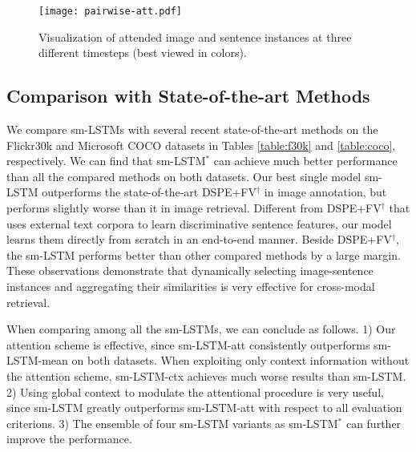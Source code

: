 \documentclass[10pt,twocolumn,letterpaper]{article}
\begin{document}
\begin{figure*}[t]
\begin{center}
\texttt{[image: pairwise-att.pdf]}
\end{center}
\caption{Visualization of attended image and sentence instances at three different timesteps (best
viewed in colors).}
\label{fig:pairwise}
\end{figure*}






\subsection{Comparison with State-of-the-art Methods}

We compare sm-LSTMs with several recent state-of-the-art methods
on the Flickr30k and Microsoft COCO datasets
in Tables \ref{table:f30k} and \ref{table:coco}, respectively.
We can find that sm-LSTM$^*$ can achieve much better performance
than all the compared methods on both datasets.
Our best single model sm-LSTM outperforms the
state-of-the-art DSPE+FV$^{\dag}$ in image annotation, but performs slightly worse
than it in image retrieval.
Different from DSPE+FV$^{\dag}$ that uses external text corpora to learn discriminative sentence features, our model
learns them directly from scratch in an end-to-end manner.
Beside DSPE+FV$^{\dag}$, the sm-LSTM performs better than other compared methods by a large margin.
These observations demonstrate that dynamically selecting image-sentence instances and
aggregating their similarities is very effective for cross-modal retrieval.


When comparing among all the sm-LSTMs, we can conclude as follows.
1) Our attention scheme is effective,
since sm-LSTM-att consistently outperforms sm-LSTM-mean on both datasets.
When exploiting only context information without the attention scheme,
sm-LSTM-ctx achieves much worse results than sm-LSTM.
2) Using global context to modulate the attentional procedure
is very useful, since sm-LSTM greatly outperforms sm-LSTM-att
with respect to all evaluation criterions.
3) The ensemble of four sm-LSTM variants as sm-LSTM$^*$ can further improve the performance.
\end{document}
